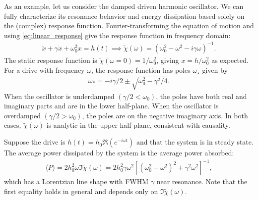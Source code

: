 \documentclass[reprint,
nofootinbib,
amsmath,amssymb,
aps]{revtex4-1}
\begin{document}
As an example, let us consider the damped driven harmonic oscillator. We can fully characterize its resonance behavior and energy dissipation based solely on the (complex) response function. Fourier-transforming the equation of motion and using  \eqref{eq:linear_response} give the response function in frequency domain:
\begin{align*}
\ddot{x} + \gamma \dot{x} + \omega_0^2 x = h(t) \implies 
\tilde{\chi}(\omega) = ( \omega_0^2 - \omega^2 - i \gamma \omega)^{-1}.
\end{align*}
The static response function is $\tilde{\chi}(\omega = 0) = 1/\omega_0^2$, giving $x = h/\omega_0^2$ as expected. For a drive with frequency $\omega$, the response function has poles $\omega_\star$ given by 
\begin{align*}
\omega_* = -i\gamma/2 \pm \sqrt{\omega_0^2  - \gamma^2/4}.
\end{align*}
When the oscillator is underdamped $(\gamma/2 < \omega_0)$, the poles have both real and imaginary parts and are in the lower half-plane. When the oscillator is overdamped $(\gamma/2 > \omega_0)$, the poles are on the negative imaginary axis. In both cases, $\tilde{\chi}(\omega)$ is analytic in the upper half-plane, consistent with causality. 

Suppose the drive is $h(t) = h_0 \Re(e^{-i\omega t})$ and that the system is in steady state. The average power dissipated by the system is the average power absorbed: 
\begin{align*}
\langle P \rangle = 2h_0^2 \omega \Im\widetilde{\chi}(\omega) = 2h_0^2  \gamma \omega^2 [(\omega_0^2 - \omega^2)^2 + \gamma^2 \omega^2]^{-1},
\end{align*}
which has a Lorentzian line shape with FWHM $\gamma$ near resonance. Note that the first equality holds in general and depends only on $\Im \widetilde{\chi}(\omega)$.
%
\end{document}
